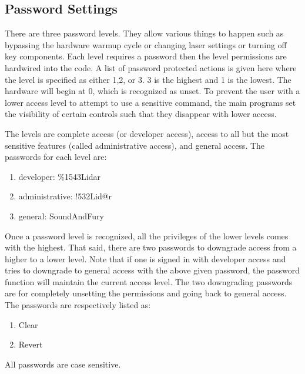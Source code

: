 \subsection{Password Settings} \label{Sec:Password}


There are three password levels. They allow various things to happen such as bypassing the hardware warmup cycle or changing laser settings or turning off key components. Each level requires a password then the level permissions are hardwired into the code. A list of password protected actions is given here where the level is specified as either 1,2, or 3. 3 is the highest and 1 is the lowest. The hardware will begin at 0, which is recognized as unset. To prevent the user with a lower access level to attempt to use a sensitive command, the main programs set the visibility of certain controls such that they disappear with lower access.

The levels are complete access (or developer access), access to all but the most sensitive features (called administrative access), and general access. The passwords for each level are:

\begin{enumerate}
\item{developer: \%1543Lidar}
\item{administrative: !532Lid@r}
\item{general: SoundAndFury}
\end{enumerate}

Once a password level is recognized, all the privileges of the lower levels comes with the highest. That said, there are two passwords to downgrade access from a higher to a lower level. Note that if one is signed in with developer access and tries to downgrade to general access with the above given password, the password function will maintain the current access level. The two downgrading passwords are for completely unsetting the permissions and going back to general access. The passwords are respectively listed as:

\begin{enumerate}
\item{Clear}
\item{Revert}
\end{enumerate}

All passwords are case sensitive.

